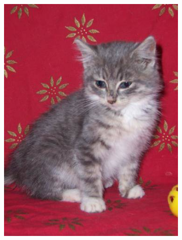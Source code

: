 \begin{figure}[htbp]
    \centering
    \caption{
        Case study: \texttt{cat-110.jpg}, $k=15$.
        Original image, reconstructed image using k-means, reconstruction error,
        and clusterings in sample space.
    }
    \begin{subfigure}[t]{0.32\textwidth}
        \includegraphics[width=\linewidth]{../../rust_code/data/kmeans/cat-110.jpg}
    \end{subfigure}
    \begin{subfigure}[t]{0.32\textwidth}

\end{subfigure}
\end{figure}
